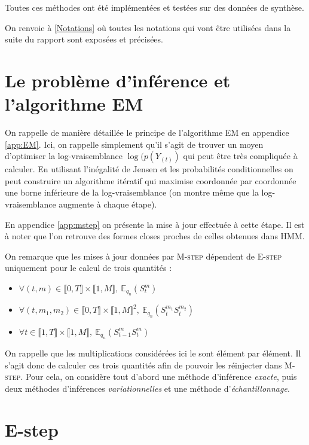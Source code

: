 \documentclass[10pt,a4paper]{article}
\newcommand{\hmm}{\textsc{HMM}}
\newcommand{\Estep}{\textsc{E-step}}
\newcommand{\Mstep}{\textsc{M-step}}
\newcommand{\EM}{\textsc{EM}}
\begin{document}
Toutes ces méthodes ont été implémentées et testées sur des données de synthèse.

On renvoie à \ref{Notations} où toutes les notations qui vont être utilisées dans la suite du rapport 
sont exposées et précisées.


\section{Le problème d'inférence et l'algorithme EM}

On rappelle de manière détaillée le principe de l'algorithme \EM{} en appendice
\ref{app:EM}.
Ici, on rappelle simplement qu'il s'agit de trouver un moyen d'optimiser la
log-vraisemblance $\log(p(Y_{(t)})$ qui peut être très compliquée à calculer.
En utilisant l'inégalité de Jensen et les probabilités conditionnelles on peut
construire un algorithme itératif qui maximise coordonnée par coordonnée une
borne inférieure de la log-vraisemblance (on montre même que la
log-vraisemblance augmente à chaque étape).

En appendice \ref{app:mstep} on présente la mise à jour effectuée à cette étape.
Il est à noter que l'on retrouve des formes closes proches de celles obtenues dans \hmm{}.

On remarque que les mises à jour données par \Mstep{} dépendent de \Estep{} 
uniquement pour le calcul de trois quantités :
\begin{itemize}
\item $\forall (t,m) \in \llbracket 0, T\rrbracket \times \llbracket 1,M 
\rrbracket, \ \mathbb{E}_{q_n}(S_t^m) $
\item $\forall (t,m_1,m_2) \in \llbracket 0, T\rrbracket \times \llbracket 
1,M\rrbracket^2, \ \mathbb{E}_{q_n}(S_t^{m_1}S_t^{m_2}) $
\item $\forall t \in \llbracket 1,T \rrbracket \times \llbracket 1,M 
\rrbracket, \ \mathbb{E}_{q_n}(S_{t-1}^mS_t^{m})$
\end{itemize}
On rappelle que les multiplications considérées ici le sont élément par 
élément. Il s'agit donc de calculer ces trois quantités afin de pouvoir les 
réinjecter dans \Mstep. Pour cela, on considère tout d'abord une méthode
d'inférence \emph{exacte}, puis deux méthodes d'inférences
\emph{variationnelles} et une méthode d'\emph{échantillonnage}.

\section{E-step}
\end{document}
